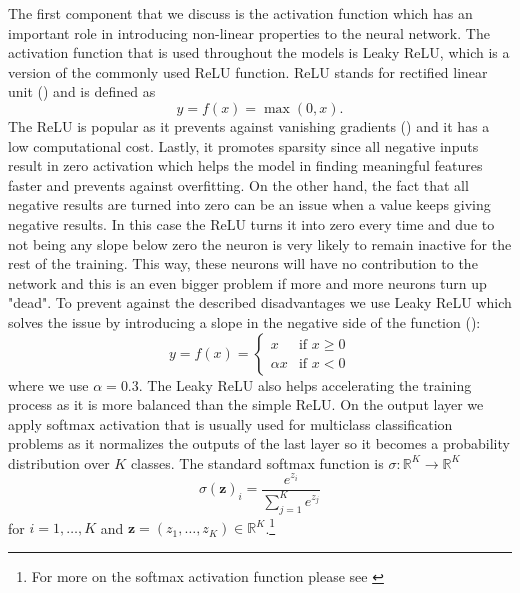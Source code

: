 \documentclass[12pt, a4paper]{article}
\begin{document}
The first component that we discuss is the activation function which has an important role in introducing non-linear properties to the neural network. The activation function that is used throughout the models is Leaky ReLU, which is a version of the commonly used ReLU function. ReLU stands for rectified linear unit (\cite{hahnloser2000digital}) and is defined as
\begin{equation}
    \label{eq:ReLU}
    y = f(x) = \max(0,x).
\end{equation}
The ReLU is popular as it prevents against vanishing gradients (\cite{glorot2011deep}) and it has a low computational cost. Lastly, it promotes sparsity since all negative inputs result in zero activation which helps the model in finding meaningful features faster and prevents against overfitting. 
On the other hand, the fact that all negative results are turned into zero can be an issue when a value keeps giving negative results. In this case the ReLU turns it into zero every time and due to not being any slope below zero the neuron is very likely to remain inactive for the rest of the training. 
This way, these neurons will have no contribution to the network and this is an even bigger problem if more and more neurons turn up "dead". To prevent against the described disadvantages we use Leaky ReLU which solves the issue by introducing a slope in the negative side of the function (\cite{maas2013rectifier}):
\begin{equation}
    \label{eq:LeakyReLU}
    y = f(x) = 
   \begin{cases*}
      x & \text{if $x \geq 0$} \\
      \alpha x        & \text{if $x<0$}
    \end{cases*}
\end{equation}
where we use $\alpha = 0.3$. The Leaky ReLU also helps accelerating the training process as it is more balanced than the simple ReLU. On the output layer we apply softmax activation that is usually used for multiclass classification problems as it normalizes the outputs of the last layer so it becomes a probability distribution over $K$ classes. The standard softmax function is $\sigma: \mathbb{R}^K \rightarrow \mathbb{R}^K$
\begin{equation}
    \label{eq:softmax}
    \sigma(\mathbf{z})_i = \frac{e^{z_i}}{\sum_{j=1}^K e^{z_j}} 
\end{equation}
for $i = 1,\dots, K$ and $\mathbf{z} = (z_1, \dots, z_K) \in \mathbb{R}^K$.\footnote{For more on the softmax activation function please see \cite{nielsen2015neural}}
\end{document}
